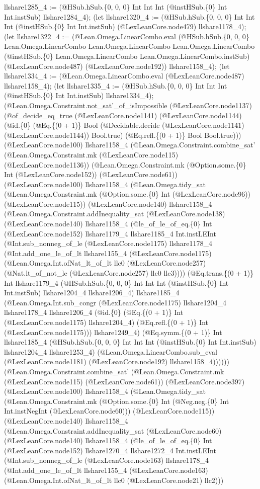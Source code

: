\documentclass[11pt]{article}
\begin{document}
llshare1285\_4 := (@HSub.hSub.\{0, 0, 0\} Int Int Int (@instHSub.\{0\} Int Int.instSub) llshare1284\_4); (let llshare1320\_4 := (@HSub.hSub.\{0, 0, 0\} Int Int Int (@instHSub.\{0\} Int Int.instSub) (@LexLeanCore.node479) llshare1178\_4); (let llshare1322\_4 := (@Lean.Omega.LinearCombo.eval (@HSub.hSub.\{0, 0, 0\} Lean.Omega.LinearCombo Lean.Omega.LinearCombo Lean.Omega.LinearCombo (@instHSub.\{0\} Lean.Omega.LinearCombo Lean.Omega.LinearCombo.instSub) (@LexLeanCore.node487) (@LexLeanCore.node192)) llshare1158\_4); (let llshare1334\_4 := (@Lean.Omega.LinearCombo.eval (@LexLeanCore.node487) llshare1158\_4); (let llshare1335\_4 := (@HSub.hSub.\{0, 0, 0\} Int Int Int (@instHSub.\{0\} Int Int.instSub) llshare1334\_4); (@Lean.Omega.Constraint.not\_sat'\_of\_isImpossible (@LexLeanCore.node1137) (@of\_decide\_eq\_true (@LexLeanCore.node1141) (@LexLeanCore.node1144) (@id.\{0\} (@Eq.\{(0 + 1)\} Bool (@Decidable.decide (@LexLeanCore.node1141) (@LexLeanCore.node1144)) Bool.true) (@Eq.refl.\{(0 + 1)\} Bool Bool.true))) (@LexLeanCore.node100) llshare1158\_4 (@Lean.Omega.Constraint.combine\_sat' (@Lean.Omega.Constraint.mk (@LexLeanCore.node115) (@LexLeanCore.node1136)) (@Lean.Omega.Constraint.mk (@Option.some.\{0\} Int (@LexLeanCore.node152)) (@LexLeanCore.node61)) (@LexLeanCore.node100) llshare1158\_4 (@Lean.Omega.tidy\_sat (@Lean.Omega.Constraint.mk (@Option.some.\{0\} Int (@LexLeanCore.node96)) (@LexLeanCore.node115)) (@LexLeanCore.node140) llshare1158\_4 (@Lean.Omega.Constraint.addInequality\_sat (@LexLeanCore.node138) (@LexLeanCore.node140) llshare1158\_4 (@le\_of\_le\_of\_eq.\{0\} Int (@LexLeanCore.node152) llshare1179\_4 llshare1185\_4 Int.instLEInt (@Int.sub\_nonneg\_of\_le (@LexLeanCore.node1175) llshare1178\_4 (@Int.add\_one\_le\_of\_lt llshare1155\_4 (@LexLeanCore.node1175) (@Lean.Omega.Int.ofNat\_lt\_of\_lt llc0 (@LexLeanCore.node257) (@Nat.lt\_of\_not\_le (@LexLeanCore.node257) llc0 llc3)))) (@Eq.trans.\{(0 + 1)\} Int llshare1179\_4 (@HSub.hSub.\{0, 0, 0\} Int Int Int (@instHSub.\{0\} Int Int.instSub) llshare1204\_4 llshare1206\_4) llshare1185\_4 (@Lean.Omega.Int.sub\_congr (@LexLeanCore.node1175) llshare1204\_4 llshare1178\_4 llshare1206\_4 (@id.\{0\} (@Eq.\{(0 + 1)\} Int (@LexLeanCore.node1175) llshare1204\_4) (@Eq.refl.\{(0 + 1)\} Int (@LexLeanCore.node1175))) llshare1249\_4) (@Eq.symm.\{(0 + 1)\} Int llshare1185\_4 (@HSub.hSub.\{0, 0, 0\} Int Int Int (@instHSub.\{0\} Int Int.instSub) llshare1204\_4 llshare1253\_4) (@Lean.Omega.LinearCombo.sub\_eval (@LexLeanCore.node1181) (@LexLeanCore.node192) llshare1158\_4)))))) (@Lean.Omega.Constraint.combine\_sat' (@Lean.Omega.Constraint.mk (@LexLeanCore.node115) (@LexLeanCore.node61)) (@LexLeanCore.node397) (@LexLeanCore.node100) llshare1158\_4 (@Lean.Omega.tidy\_sat (@Lean.Omega.Constraint.mk (@Option.some.\{0\} Int (@Neg.neg.\{0\} Int Int.instNegInt (@LexLeanCore.node60))) (@LexLeanCore.node115)) (@LexLeanCore.node140) llshare1158\_4 (@Lean.Omega.Constraint.addInequality\_sat (@LexLeanCore.node60) (@LexLeanCore.node140) llshare1158\_4 (@le\_of\_le\_of\_eq.\{0\} Int (@LexLeanCore.node152) llshare1270\_4 llshare1272\_4 Int.instLEInt (@Int.sub\_nonneg\_of\_le (@LexLeanCore.node163) llshare1178\_4 (@Int.add\_one\_le\_of\_lt llshare1155\_4 (@LexLeanCore.node163) (@Lean.Omega.Int.ofNat\_lt\_of\_lt llc0 (@LexLeanCore.node21) llc2))) 
\end{document}
